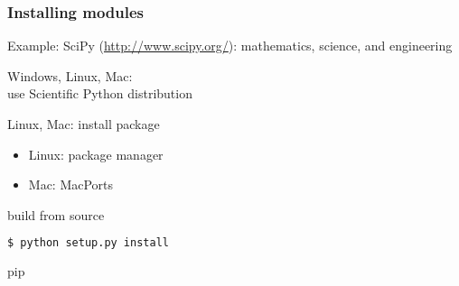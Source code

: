 \begin{frame}[fragile]
\frametitle{Installing modules}

Example: SciPy (\url{http://www.scipy.org/}): mathematics, science, and engineering

\begin{description}
\item<1->[Easy way:] Windows, Linux, Mac:\\
use Scientific Python distribution 
\item<2->[Intermediate:] Linux, Mac: install package\\
\begin{itemize}
\item Linux: package manager
\item Mac: MacPorts %
\end{itemize}
\item<3->[Harder:] build from source
\begin{lstlisting}[language=bash]
 $ python setup.py install
\end{lstlisting}
\item<4->[Better:] pip
\end{description}

\end{frame}



